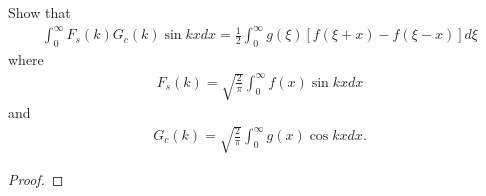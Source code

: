 \begin{problem}{4}
  Show that
  \begin{align*}
    \int_0^\infty F_s(k) G_c(k) \sin kx dx = \frac{1}{2}\int_0^\infty g(\xi) \left[f(\xi + x) - f(\xi - x)\right]d\xi
  \end{align*}
  where
  \begin{align*}
    F_s(k) = \sqrt{\frac{2}{\pi}}\int_0^\infty f(x) \sin kx dx
  \end{align*}
  and
  \begin{align*}
    G_c(k) = \sqrt{\frac{2}{\pi}}\int_0^\infty g(x) \cos kx dx.
  \end{align*}
\end{problem}

\begin{proof}
\end{proof}
\newpage
